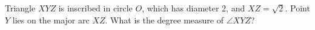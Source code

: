 Triangle $XYZ$ is inscribed in circle $O$, which has diameter $2$, and $XZ=\sqrt2$. Point $Y$ lies on the major arc $XZ$. What is the degree measure of $\angle XYZ$?

